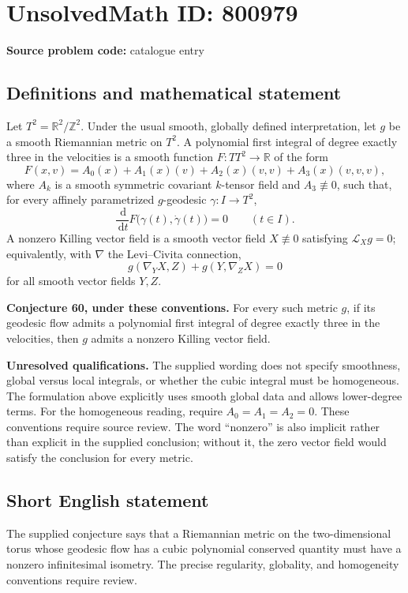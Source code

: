 \documentclass[11pt]{article}
\newcommand{\Z}{\mathbb{Z}}
\newcommand{\R}{\mathbb{R}}
\newcommand{\dd}{\,\mathrm{d}}
\begin{document}
\section*{UnsolvedMath ID: 800979}
\textbf{Source problem code:} catalogue entry
\subsection{Definitions and mathematical statement}
Let \(T^2=\R^2/\Z^2\). Under the usual smooth, globally defined interpretation, let \(g\) be a smooth Riemannian metric on \(T^2\). A polynomial first integral of degree exactly three in the velocities is a smooth function \(F:TT^2\to\R\) of the form
\[
F(x,v)=A_0(x)+A_1(x)(v)+A_2(x)(v,v)+A_3(x)(v,v,v),
\]
where \(A_k\) is a smooth symmetric covariant \(k\)-tensor field and \(A_3\not\equiv0\), such that, for every affinely parametrized \(g\)-geodesic \(\gamma:I\to T^2\),
\[
\frac{\dd}{\dd t}F\bigl(\gamma(t),\dot\gamma(t)\bigr)=0
\qquad(t\in I).
\]
A nonzero Killing vector field is a smooth vector field \(X\not\equiv0\) satisfying \(\mathcal L_Xg=0\); equivalently, with \(\nabla\) the Levi--Civita connection,
\[
g(\nabla_YX,Z)+g(Y,\nabla_ZX)=0
\]
for all smooth vector fields \(Y,Z\).

\textbf{Conjecture 60, under these conventions.} For every such metric \(g\), if its geodesic flow admits a polynomial first integral of degree exactly three in the velocities, then \(g\) admits a nonzero Killing vector field.

\textbf{Unresolved qualifications.} The supplied wording does not specify smoothness, global versus local integrals, or whether the cubic integral must be homogeneous. The formulation above explicitly uses smooth global data and allows lower-degree terms. For the homogeneous reading, require \(A_0=A_1=A_2=0\). These conventions require source review. The word ``nonzero'' is also implicit rather than explicit in the supplied conclusion; without it, the zero vector field would satisfy the conclusion for every metric.
\subsection{Short English statement}
The supplied conjecture says that a Riemannian metric on the two-dimensional torus whose geodesic flow has a cubic polynomial conserved quantity must have a nonzero infinitesimal isometry. The precise regularity, globality, and homogeneity conventions require review.
\end{document}
